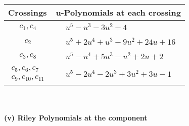 \documentclass[1p]{elsarticle_modified}
\theoremstyle{definition}
\begin{document}
\begin{tabular}{m{50pt}|m{274pt}}
Crossings & \hspace{64pt}u-Polynomials at each crossing \\
\hline $$\begin{aligned}c_{1},c_{4}\end{aligned}$$&$\begin{aligned}
&u^5- u^3-3 u^2+4
\end{aligned}$\\
\hline $$\begin{aligned}c_{2}\end{aligned}$$&$\begin{aligned}
&u^5+2 u^4+u^3+9 u^2+24 u+16
\end{aligned}$\\
\hline $$\begin{aligned}c_{3},c_{8}\end{aligned}$$&$\begin{aligned}
&u^5- u^4+5 u^3- u^2+2 u+2
\end{aligned}$\\
\hline $$\begin{aligned}c_{5},c_{6},c_{7}\\c_{9},c_{10},c_{11}\end{aligned}$$&$\begin{aligned}
&u^5-2 u^4-2 u^3+3 u^2+3 u-1
\end{aligned}$\\
\hline
\end{tabular}\\~\\
\newpage\renewcommand{\arraystretch}{1}
\flushleft \textbf{(v) Riley Polynomials at the component}\newline \\
\end{document}
